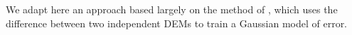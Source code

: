 \documentclass{article}
\begin{document}
We adapt here an approach based largely on the method of
\citet{Ehlschlaeger_1996}, which uses the difference between two
independent DEMs to train a Gaussian model of error.

%
%
%
\end{document}
